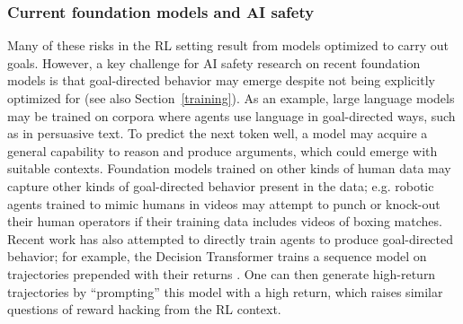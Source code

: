 \subsubsection{Current foundation models and AI safety}

Many of these risks in the RL setting result from models optimized to carry out goals. However, a key challenge for AI safety research on recent foundation models is that goal-directed behavior may emerge despite not being explicitly optimized for (see also Section~\ref{training}). As an example, large language models may be trained on corpora where agents use language in goal-directed ways, such as in persuasive text. To predict the next token well, a model may acquire a general capability to reason and produce arguments, which could emerge with suitable contexts. Foundation models trained on other kinds of human data may capture other kinds of goal-directed behavior present in the data; e.g. robotic agents trained to mimic humans in videos may attempt to punch or knock-out their human operators if their training data includes videos of boxing matches. Recent work has also attempted to directly train agents to produce goal-directed behavior; for example, the Decision Transformer trains a sequence model on trajectories prepended with their returns \citep{Srivastava2019TrainingAU, Schmidhuber2019ReinforcementLU, Chen2021DecisionTR}. One can then generate high-return trajectories by ``prompting'' this model with a high return, which raises similar questions of reward hacking from the RL context. 

